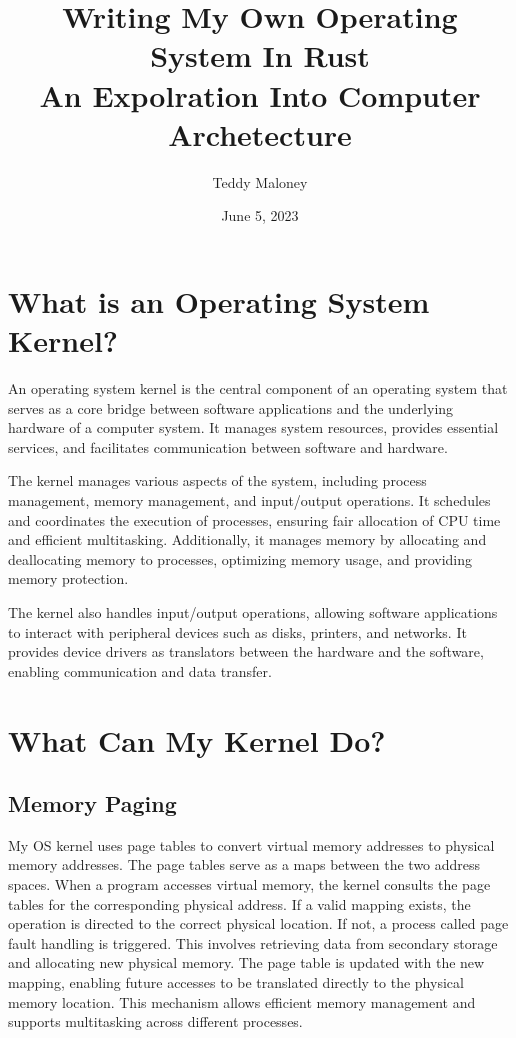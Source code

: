 \documentclass[12pt, letterpaper]{article}
\title{
Writing My Own Operating System In Rust\\
\large An Expolration Into Computer Archetecture
}
\author{Teddy Maloney}
\date{June 5, 2023}
\begin{document}
\maketitle

\section{What is an Operating System Kernel?}

An operating system kernel is the central component of an operating system that serves as a core bridge between 
software applications and the underlying hardware of a computer system. It manages system resources, provides 
essential services, and facilitates communication between software and hardware.

The kernel manages various aspects of the system, including process management, memory management, 
and input/output operations. It schedules and coordinates the execution of processes, ensuring fair allocation 
of CPU time and efficient multitasking. Additionally, it manages memory by allocating and deallocating memory 
to processes, optimizing memory usage, and providing memory protection.

The kernel also handles input/output operations, allowing software applications to interact with peripheral 
devices such as disks, printers, and networks. It provides device drivers as translators between the hardware 
and the software, enabling communication and data transfer.

\newpage

\section{What Can My Kernel Do?}

\subsection{Memory Paging}
My OS kernel uses page tables to convert virtual memory addresses to physical memory addresses. 
The page tables serve as a maps between the two address spaces. When a program accesses virtual memory, 
the kernel consults the page tables for the corresponding physical address. If a valid mapping exists, 
the operation is directed to the correct physical location. If not, a process called page fault 
handling is triggered. This involves retrieving data from secondary storage and allocating new physical 
memory. The page table is updated with the new mapping, enabling future accesses to be translated directly 
to the physical memory location. This mechanism allows efficient memory management and supports 
multitasking across different processes.
\end{document}
